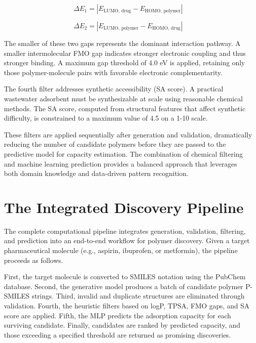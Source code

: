 \begin{equation}
	\Delta E_1 = |E_{\text{LUMO, drug}} - E_{\text{HOMO, polymer}}|
\end{equation}

\begin{equation}
	\Delta E_2 = |E_{\text{LUMO, polymer}} - E_{\text{HOMO, drug}}|
\end{equation}

The smaller of these two gaps represents the dominant interaction pathway. A smaller intermolecular FMO gap indicates stronger electronic coupling and thus stronger binding. A maximum gap threshold of 4.0 eV is applied, retaining only those polymer-molecule pairs with favorable electronic complementarity.

The fourth filter addresses synthetic accessibility (SA score). A practical wastewater adsorbent must be synthesizable at scale using reasonable chemical methods. The SA score, computed from structural features that affect synthetic difficulty, is constrained to a maximum value of 4.5 on a 1-10 scale.

These filters are applied sequentially after generation and validation, dramatically reducing the number of candidate polymers before they are passed to the predictive model for capacity estimation. The combination of chemical filtering and machine learning prediction provides a balanced approach that leverages both domain knowledge and data-driven pattern recognition.

\section{The Integrated Discovery Pipeline}
\label{sec:discovery_pipeline_section}

The complete computational pipeline integrates generation, validation, filtering, and prediction into an end-to-end workflow for polymer discovery. Given a target pharmaceutical molecule (e.g., aspirin, ibuprofen, or metformin), the pipeline proceeds as follows.

First, the target molecule is converted to SMILES notation using the PubChem database. Second, the generative model produces a batch of candidate polymer P-SMILES strings. Third, invalid and duplicate structures are eliminated through validation. Fourth, the heuristic filters based on logP, TPSA, FMO gaps, and SA score are applied. Fifth, the MLP predicts the adsorption capacity for each surviving candidate. Finally, candidates are ranked by predicted capacity, and those exceeding a specified threshold are returned as promising discoveries.

